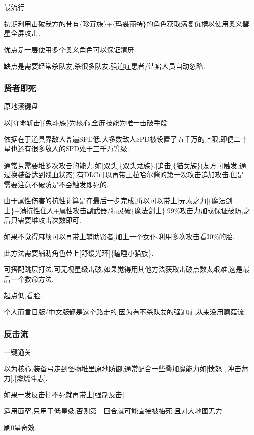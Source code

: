 		最流行

		初期利用击破我方的带有{\color{red}{自我牺牲}}\{珍茸族\}+{\color{red}{惊惧死灵}}\{玛裘丽特\}的角色获取满复仇槽以使用奥义彗星全屏攻击.

		优点是一层使用多个奥义角色可以保证清屏.
		
		缺点是需要经常杀队友,杀很多队友,强迫症患者/洁癖人员自动忽略.

		\subsubsection{贤者即死}

		原地滚键盘

		以[夺命斩击]\{兔斗族\}为核心,全屏技能为唯一击破手段.

		依据在于道具界敌人普遍SPD低,大多数敌人SPD被设置了五千万的上限,即便二十星也还有很多敌人的SPD处于三千万等级.

		通常只需要堆多次攻击的能力,如[双头]\{双头龙族\},[追击]\{猫女族\}(友方可触发,通过换装备达到残血状态),有DLC可以再带上拉哈尔酱的第一次攻击追加攻击.但是需要注意不破防是不会触发即死的.

		由于属性伤害的抗性计算是在最后一步完成,所以可以带上[元素之力]\{魔法剑士\}+满抗性住人+属性攻击副武器/精灵破\{魔法剑士\}.99\%攻击力加成保证破防,之后只需要堆攻击次数即可.

		如果不觉得麻烦可以再带上辅助贤者,加上一个女仆.利用多次攻击看30\%的脸.

		此方法需要辅助角色带上[舒缓光环]\{瞌睡小猫族\}.

		可搭配跳层打法,可无视星级击破,如果觉得用其他方法获取击破点数太艰难,这是最后一个救命方法.

		起点低,看脸.

		个人而言日版/中文版都是这个路走的,因为有不杀队友的强迫症,从来没用蘑菇流.

		\newpage

		\subsubsection{反击流}

		一键通关

		以{\color{red}{迎击架势}}为核心,装备弓走到怪物堆里原地防御,通常配合一些叠加魔能力如[愤怒],[冲击蓄力],[燃烧斗志].

		如果一发反击打不死就再带上[强制反击].

		适用面窄,只用于低星级,否则第一回合就可能直接被抽死.且对大地图无力.

		刷0星奇效.

